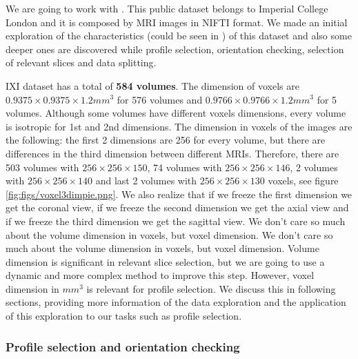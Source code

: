 We are going to work with . This public dataset belongs to Imperial College London and it is composed by MRI images in NIFTI format. We made an initial exploration of the characteristics (could be seen in ) of this dataset and also some deeper ones are discovered while profile selection, orientation checking, selection of relevant slices and data splitting. 

IXI dataset has a total of \textbf{584 volumes}. The dimension of voxels are $0.9375\times0.9375\times1.2 mm^3$ for 576 volumes and $0.9766\times0.9766\times1.2 mm^3$ for 5 volumes. Although some volumes have different voxels dimensions, every volume is isotropic for 1st and 2nd dimensions. The dimension in voxels of the images are the following: the first 2 dimensions are 256 for every volume, but there are differences in the third dimension between different MRIs. Therefore, there are 503 volumes with $256\times256\times150$, 74 volumes with $256\times256\times146$, 2 volumes with $256\times256\times140$ and last 2 volumes with $256\times256\times130$ voxels, see figure \ref{fig:figs/voxel3dimpie.png}. We also realize that if we freeze the first dimension we get the coronal view, if we freeze the second dimension we get the axial view and if we freeze the third dimension we get the sagittal view. We don't care so much about the volume dimension in voxels, but voxel dimension. We don't care so much about the volume dimension in voxels, but voxel dimension. Volume dimension is significant in relevant slice selection, but we are going to use a dynamic and more complex method to improve this step. However, voxel dimension in $mm^3$ is relevant for profile selection. We discuss this in following sections, providing more information of the data exploration and the application of this exploration to our tasks such as profile selection. 


\subsubsection{Profile selection and orientation checking}

